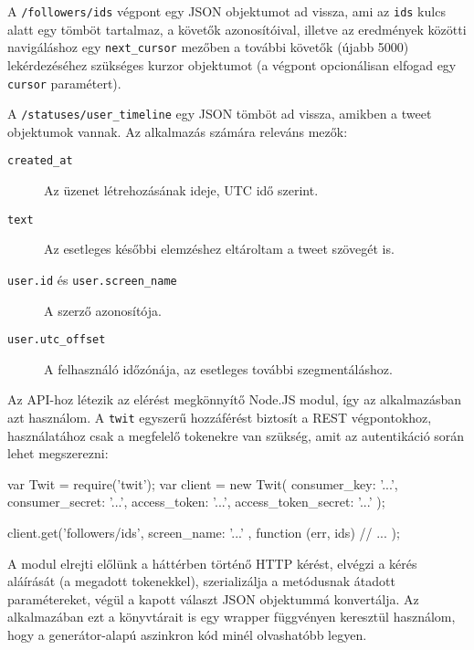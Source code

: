 A \verb=/followers/ids= végpont egy JSON objektumot ad vissza,
ami az \verb=ids= kulcs alatt egy tömböt tartalmaz, a követők azonosítóival,
illetve az eredmények közötti navigáláshoz egy \verb=next_cursor= mezőben
a további követők (újabb 5000) lekérdezéséhez szükséges kurzor objektumot
(a végpont opcionálisan elfogad egy \verb=cursor= paramétert).

A \verb=/statuses/user_timeline= egy JSON tömböt ad vissza, amikben a tweet
objektumok vannak. Az alkalmazás számára releváns mezők:

\begin{description}
  \item[\texttt{created\_at}] Az üzenet létrehozásának ideje, UTC idő szerint.
  \item[\texttt{text}] Az esetleges későbbi elemzéshez eltároltam a tweet
    szövegét is.
  \item[\texttt{user.id} és \texttt{user.screen\_name}] A szerző azonosítója.
  \item[\texttt{user.utc\_offset}] A felhasználó időzónája, az esetleges
    további szegmentáláshoz.
\end{description}

Az API-hoz létezik az elérést megkönnyítő Node.JS modul, így az alkalmazásban
azt használom. A \verb=twit= egyszerű hozzáférést biztosít a REST végpontokhoz,
használatához csak a megfelelő tokenekre van szükség, amit az autentikáció
során lehet megszerezni:

\begin{js}
var Twit = require('twit');
var client = new Twit({
  consumer_key: '...',
  consumer_secret: '...',
  access_token: '...',
  access_token_secret: '...'
});

client.get('followers/ids', {
  screen_name: '...'
}, function (err, ids) {
  // ...
});
\end{js}

A modul elrejti előlünk a háttérben történő HTTP kérést, elvégzi a kérés
aláírását (a megadott tokenekkel), szerializálja a metódusnak átadott
paramétereket, végül a kapott választ JSON objektummá konvertálja.
Az alkalmazában ezt a könyvtárait is egy wrapper függvényen keresztül
használom, hogy a generátor-alapú aszinkron kód minél olvashatóbb legyen.
